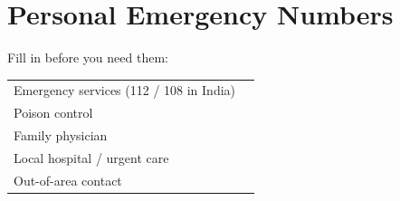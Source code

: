 \section{Personal Emergency Numbers}

Fill in before you need them:

\begin{center}
\begin{tabular}{@{}>{\raggedright\arraybackslash}p{5.5cm}p{8cm}@{}}
\hline
Emergency services (112 / 108 in India) & \rule{0pt}{2.5ex}\hrulefill \\
Poison control & \hrulefill \\
Family physician & \hrulefill \\
Local hospital / urgent care & \hrulefill \\
Out-of-area contact & \hrulefill \\
\hline
\end{tabular}
\end{center}

